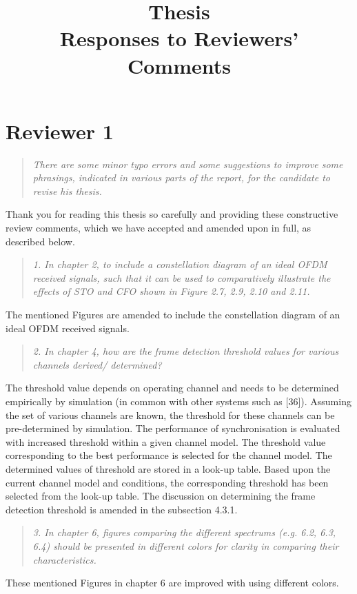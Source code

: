 \documentclass{article}
\title{Thesis\\ Responses to Reviewers' Comments}
\begin{document}
\maketitle

\section*{Reviewer 1}

\begin{quote}
\emph{There are some minor typo errors and some suggestions to improve some phrasings, indicated in various parts of the report, for the candidate to revise his thesis.}
\end{quote}
Thank you for reading this thesis so carefully and providing these constructive review comments, which we have accepted and amended upon in full, as described below. 

\begin{quote}
\emph{1. In chapter 2, to include a constellation diagram of an ideal OFDM received signals, such that it can be used to comparatively illustrate the effects of STO and CFO shown in Figure 2.7, 2.9, 2.10 and 2.11.}
\end{quote} 
The mentioned Figures are amended to include the constellation diagram of an ideal OFDM received signals.

\begin{quote}
\emph{2. In chapter 4, how are the frame detection threshold values for various channels derived/ determined?}
\end{quote}
The threshold value depends on operating channel and needs to be determined empirically by simulation (in common with other systems such as [36]). Assuming the set of various channels are known, the threshold for these channels can be pre-determined by simulation. The performance of synchronisation is evaluated with increased threshold within a given channel model. The threshold value corresponding to the best performance is selected for the channel model. The determined values of threshold are stored in a look-up table. Based upon the current channel model and conditions, the corresponding threshold has been selected from the look-up table. 
The discussion on determining the frame detection threshold is amended in the subsection 4.3.1.

\begin{quote}
\emph{3. In chapter 6, figures comparing the different spectrums (e.g. 6.2, 6.3, 6.4) should be presented in different colors for clarity in comparing their characteristics.}
\end{quote}
These mentioned Figures in chapter 6 are improved with using different colors.
\end{document}
